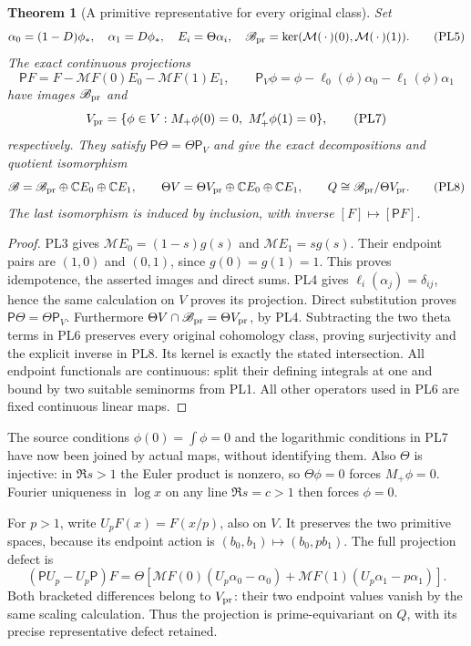 \documentclass[11pt,a4paper]{article}
\newtheorem{theorem}{Theorem}[section]
\theoremstyle{definition}\newtheorem{definition}[theorem]{Definition}
\newcommand{\C}{\mathbb C}\newcommand{\R}{\mathbb R}
\begin{document}
\begin{theorem}[A primitive representative for every original class]
\label{pl:thm:universal}
Set
\[
 \alpha_0=(1-D)\phi_*,\quad\alpha_1=D\phi_*,
 \quad E_i=\Theta\alpha_i,\quad
 \mathscr B_{\rm pr}=\ker(\mathcal M(\,\cdot\,)(0),\mathcal M(\,\cdot\,)(1)).
 \tag{PL5}
\]
The exact continuous projections
\[
 \mathsf P F=F-\mathcal M F(0)E_0-\mathcal M F(1)E_1,\qquad
 \mathsf P_V\phi=\phi-\ell_0(\phi)\alpha_0-\ell_1(\phi)\alpha_1
 \tag{PL6}\label{pl:pl:projection}
\]
have images \(\mathscr B_{\rm pr}\) and
\[
 V_{\rm pr}=\{\phi\in V:M_+\phi(0)=0,\ M_+'\phi(1)=0\},
 \tag{PL7}
\]
respectively. They satisfy \(\mathsf P\Theta=\Theta\mathsf P_V\) and
give the exact decompositions and quotient isomorphism
\[
 \mathscr B=\mathscr B_{\rm pr}\oplus\C E_0\oplus\C E_1,\qquad
 \Theta V=\Theta V_{\rm pr}\oplus\C E_0\oplus\C E_1,\qquad
 Q\cong\mathscr B_{\rm pr}/\Theta V_{\rm pr}.
 \tag{PL8}\label{pl:pl:quotient}
\]
The last isomorphism is induced by inclusion, with inverse
\([F]\mapsto[\mathsf P F]\).
\end{theorem}
\begin{proof}
PL3 gives \(\mathcal M E_0=(1-s)g(s)\) and \(\mathcal M E_1=sg(s)\).
Their endpoint pairs are \((1,0)\) and \((0,1)\), since \(g(0)=g(1)=1\).
This proves idempotence, the asserted images and direct sums.
PL4 gives \(\ell_i(\alpha_j)=\delta_{ij}\), hence the same calculation
on \(V\) proves its projection. Direct substitution proves
\(\mathsf P\Theta=\Theta\mathsf P_V\).
Furthermore \(\Theta V\cap\mathscr B_{\rm pr}=\Theta V_{\rm pr}\), by PL4.
Subtracting the two theta terms in PL6 preserves every original
cohomology class, proving surjectivity and the explicit inverse in
PL8. Its kernel is exactly the stated intersection.
All endpoint functionals are continuous: split their defining
integrals at one and bound by two suitable seminorms from PL1.
All other operators used in PL6 are fixed continuous linear maps.
\end{proof}

The source conditions \(\phi(0)=\int\phi=0\) and the logarithmic
conditions in PL7 have now been joined by actual maps, without
identifying them. Also \(\Theta\) is injective: in \(\Re s>1\) the
Euler product is nonzero, so \(\Theta\phi=0\) forces \(M_+\phi=0\).
Fourier uniqueness in \(\log x\) on any line \(\Re s=c>1\) then
forces \(\phi=0\).

For \(p>1\), write \(U_pF(x)=F(x/p)\), also on \(V\).
It preserves the two primitive spaces, because its endpoint action is
\((b_0,b_1)\mapsto(b_0,pb_1)\). The full projection defect is
\[
 (\mathsf P U_p-U_p\mathsf P)F
 =\Theta\!\left[
 \mathcal M F(0)(U_p\alpha_0-\alpha_0)
 +\mathcal M F(1)(U_p\alpha_1-p\alpha_1)\right].
 \tag{PL9}\label{pl:pl:projection-defect}
\]
Both bracketed differences belong to \(V_{\rm pr}\): their two
endpoint values vanish by the same scaling calculation. Thus the
projection is prime-equivariant on \(Q\), with its precise
representative defect retained.
\end{document}
